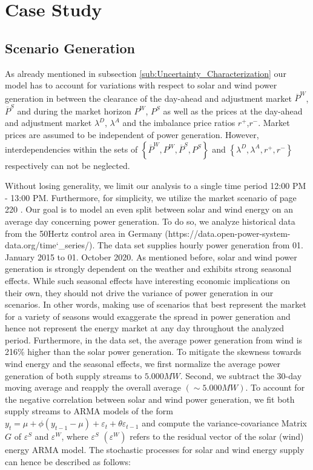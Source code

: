 
\section{Case Study}

\subsection{Scenario Generation}
As already mentioned in subsection \ref{sub:Uncertainty_Characterization} our model has to account for variations with respect to solar and wind power generation in between the clearance of the day-ahead and adjustment market $\overline{P}^{W}$,$\overline{P}^{S}$ and during the market horizon ${P}^{W}$, ${P}^{S}$ as well as the prices at the day-ahead and adjustment market $\lambda^D$, $\lambda^A$ and the imbalance price ratios $r^+$,$r^-$. Market prices are assumed to be independent of power generation. However, interdependencies within the sets of $\left\lbrace\overline{P}^{W},{P}^{W},\overline{P}^{S},{P}^{S}\right\rbrace$ and $\left\lbrace\lambda^D,\lambda^A,r^+,r^-\right\rbrace$ respectively can not be neglected. 


Without losing generality, we limit our analysis to a single time period 12:00 PM - 13:00 PM. Furthermore, for simplicity, we utilize the market scenario of page 220 \cite{Conejo10}. %
Our goal is to model an even split between solar and wind energy on an average day concerning power generation. To do so, we analyze historical data from the 50Hertz control area in Germany (https://data.open-power-system-data.org/time\char`_series/). The data set supplies hourly power generation from 01. January 2015 to 01. October 2020. As mentioned before, solar and wind power generation is strongly dependent on the weather and exhibits strong seasonal effects. While such seasonal effects have interesting economic implications on their own, they should not drive the variance of power generation in our scenarios. In other words, making use of scenarios that best represent the market for a variety of seasons would exaggerate the spread in power generation and hence not represent the energy market at any day throughout the analyzed period. Furthermore, in the data set, the average power generation from wind is 216\% higher than the solar power generation. To mitigate the skewness towards wind energy and the seasonal effects, we first normalize the average power generation of both supply streams to $5.000 MW$. Second, we subtract the 30-day moving average and reapply the overall average $\left(\sim 5.000 MW\right)$. To account for the negative correlation between solar and wind power generation, we fit both supply streams to ARMA models of the form $y_t = \mu + \phi \left(y_{t-1}-\mu\right)+\varepsilon_t + \theta\varepsilon_{t-1}$ and compute the variance-covariance Matrix $G$ of $\varepsilon^S$ and $\varepsilon^W$, where $\varepsilon^S$ $\left(\varepsilon^W\right)$ refers to the residual vector of the solar (wind) energy ARMA model. The stochastic processes 
for solar and wind energy supply can hence be described as follows:

